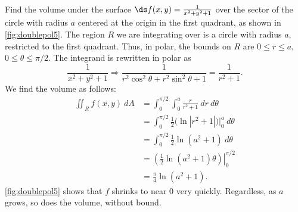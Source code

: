 \begin{example}\label{ex_doublepol5}
Find the volume under the surface $\ds f(x,y) =\frac1{x^2+y^2+1}$ over the  sector of the circle with radius $a$ centered at the origin in the first quadrant, as shown in \autoref{fig:doublepol5}.
\solution
{}
%
The region $R$ we are integrating over is a circle with radius $a$, restricted to the first quadrant. Thus, in polar, the bounds on $R$ are $0\leq r\leq a$, $0\leq\theta\leq\pi/2$. The integrand is rewritten in polar as 
\[
\frac{1}{x^2+y^2+1} \Rightarrow
\frac{1}{r^2\cos^2\theta+r^2\sin^2\theta+1} = \frac1{r^2+1}.
\]
We find the volume as follows:
\begin{align*}
\iint_Rf(x,y)\ dA &= \int_0^{\pi/2}\int_0^a\frac{r}{r^2+1}\ dr\ d\theta\\
		&= \int_0^{\pi/2} \frac12\big(\ln|r^2+1|\big)\Big|_0^a\ d\theta\\
		&=\int_0^{\pi/2} \frac12\ln(a^2+1)\ d\theta\\
		&= \left.\left(\frac12\ln(a^2+1)\theta\right)\right|_0^{\pi/2}\\
		&= \frac{\pi}{4}\ln(a^2+1).
\end{align*}
\autoref{fig:doublepol5}  shows that $f$ shrinks to near 0 very quickly. Regardless, as $a$ grows, so does the volume, without bound. 
\end{example}

